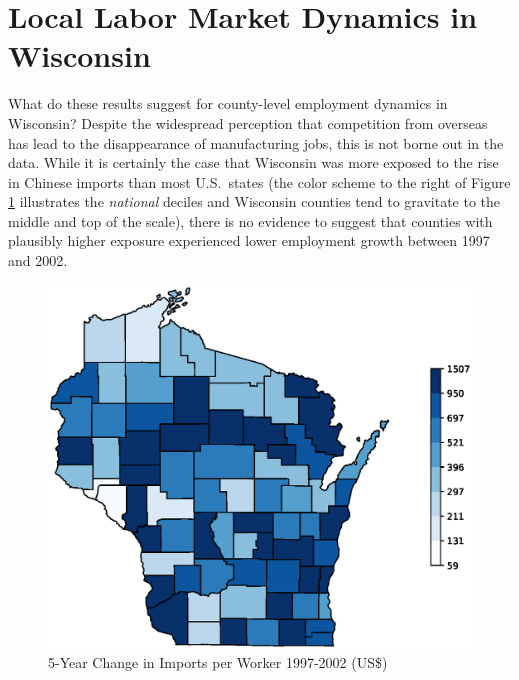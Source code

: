 \documentclass[onehalfspacing,11pt]{article}
\begin{document}
\section{Local Labor Market Dynamics in Wisconsin}
What do these results suggest for county-level employment dynamics in Wisconsin? Despite the widespread perception that competition from overseas has lead to the disappearance of manufacturing jobs, this is not borne out in the data. While it is certainly the case that Wisconsin was more exposed to the rise in Chinese imports than most U.S.~states (the color scheme to the right of Figure \ref{fig:d5ipw} illustrates the {\it national} deciles and Wisconsin counties tend to gravitate to the middle and top of the scale), there is no evidence to suggest that counties with plausibly higher exposure experienced lower employment growth between 1997 and 2002.
\begin{figure}
\begin{center}
 \includegraphics[width=.95\textwidth]{d5_ipw_1997.eps}
\caption{5-Year Change in Imports per Worker 1997-2002 (US\$)}
\label{fig:d5ipw}
\end{center}
\end{figure}
\end{document}
